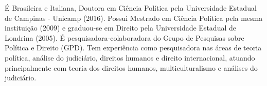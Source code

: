 
\begin{cvparagraph}

É Brasileira e Italiana, Doutora em Ciência Política pela Universidade Estadual de Campinas - Unicamp (2016). Possui Mestrado em Ciência Política pela mesma instituição (2009) e graduou-se em Direito pela Universidade Estadual de Londrina (2005). É pesquisadora-colaboradora do Grupo de Pesquisas sobre Política e Direito (GPD). Tem experiência como pesquisadora nas áreas de teoria política, análise do judiciário, direitos humanos e direito internacional, atuando principalmente com teoria dos direitos humanos, multiculturalismo e análises do judiciário.



\end{cvparagraph}
